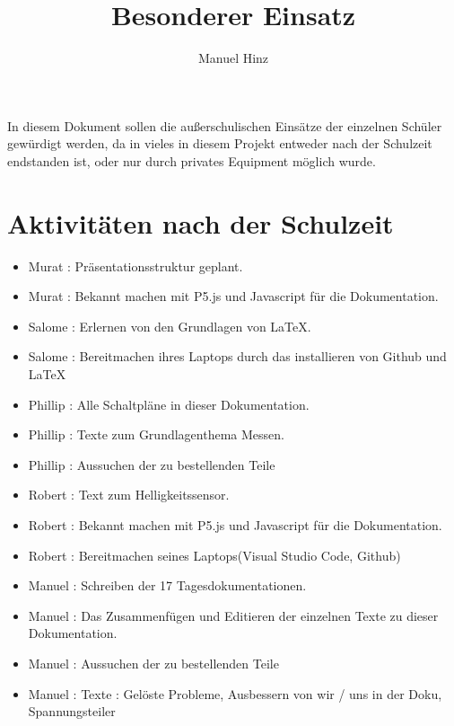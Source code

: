 \documentclass{article}
\author{Manuel Hinz}
\title{Besonderer Einsatz}
\begin{document}
\maketitle

In diesem Dokument sollen die au{\ss}erschulischen Eins\"{a}tze der einzelnen Sch\"{u}ler gew\"{u}rdigt werden, da in vieles in diesem Projekt entweder nach der Schulzeit endstanden ist, oder nur durch privates Equipment m\"{o}glich wurde.


\section{Aktivit\"{a}ten nach der Schulzeit}

\begin{itemize}

\item Murat : Pr\"{a}sentationsstruktur geplant.

\item Murat : Bekannt machen mit P5.js und Javascript f\"{u}r die Dokumentation.

\item Salome : Erlernen von den Grundlagen von \LaTeX .

\item Salome : Bereitmachen ihres Laptops durch das installieren  von Github und \LaTeX

\item Phillip : Alle Schaltpl\"{a}ne in dieser Dokumentation.

\item Phillip : Texte zum Grundlagenthema Messen.

\item Phillip : Aussuchen der zu bestellenden Teile

\item Robert : Text zum Helligkeitssensor.

\item Robert : Bekannt machen mit P5.js und Javascript f\"{u}r die Dokumentation.

\item Robert : Bereitmachen seines Laptops(Visual Studio Code, Github)


\item Manuel : Schreiben der 17 Tagesdokumentationen.

\item Manuel : Das Zusammenf\"{u}gen und Editieren der einzelnen Texte zu dieser Dokumentation.

\item Manuel : Aussuchen der zu bestellenden Teile

\item Manuel : Texte :  Gel\"{o}ste Probleme, Ausbessern von wir / uns in der Doku, Spannungsteiler  

\end{itemize}
\end{document}
